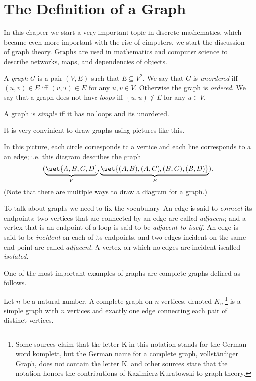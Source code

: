 \chapter{The Definition of a Graph}
In this chapter we start a very important topic in discrete mathematics, which
became even more important with the rise of cimputers, we start the discussion
of graph theory. Graphs are used in mathematics and computer science to describe
networks, maps, and dependencies of objects.

\begin{definition}
  A \emph{graph} $G$ is a pair $(V, E)$ such that $E \subseteq V^2$.
  We say that $G$ is \emph{unordered} iff $(u, v) \in E$ iff $(v, u) \in E$ for
  any $u, v \in V$. Otherwise the graph is \emph{ordered}.
  We say that a graph does not have \emph{loops} iff $(u, u) \notin E$ for any
  $u \in V$.
\end{definition}
A graph is \emph{simple} iff it has no loops and its unordered.

It is very convinient to draw graphs using pictures like this.
\begin{center}
\end{center}
In this picture, each circle corresponds to a vertice and each line corresponds
to a an edge; i.e. this diagram describes the graph
\[
  (\underbrace{\set{A, B, C, D}}_V,
  \underbrace{\set{(A, B), (A, C), (B, C), (B, D)}}_E).
\]
(Note that there are multiple ways to draw a diagram for a graph.)

To talk about graphs we need to fix the vocubulary.
An edge is said to \emph{connect} its endpoints; two vertices that are
connected by an edge are called \emph{adjacent}; and a vertex that is an
endpoint of a loop is said to be \emph{adjacent to itself}. An edge is said to
be \emph{incident} on each of its endpoints, and two edges incident
on the same end point are called \emph{adjacent}. A vertex on which no edges
are incident iscalled \emph{isolated}.

One of the most important examples of graphs are complete graphs defined as
follows.
\begin{definition}
  Let $n$ be a natural number. A complete graph on $n$ vertices, denoted
  $K_n$,\footnote[][-2cm]{%
    Some sources claim that the letter K in this notation stands for the German
    word komplett, but the German name for a complete graph, vollst\"{a}ndiger
    Graph, does not contain the letter K, and other sources state that the
    notation honors the contributions of Kazimierz Kuratowski to graph theory.
  } is a simple graph with $n$ vertices and exactly one edge connecting
  each pair of distinct vertices.
\end{definition}

